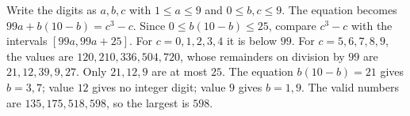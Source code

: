 Write the digits as $a,b,c$ with $1\le a\le9$ and $0\le b,c\le9$. The equation becomes $99a+b(10-b)=c^3-c$. Since $0\le b(10-b)\le25$, compare $c^3-c$ with the intervals $[99a,99a+25]$. For $c=0,1,2,3,4$ it is below $99$. For $c=5,6,7,8,9$, the values are $120,210,336,504,720$, whose remainders on division by $99$ are $21,12,39,9,27$. Only $21,12,9$ are at most $25$. The equation $b(10-b)=21$ gives $b=3,7$; value $12$ gives no integer digit; value $9$ gives $b=1,9$. The valid numbers are $135,175,518,598$, so the largest is $\boxed{598}$.
